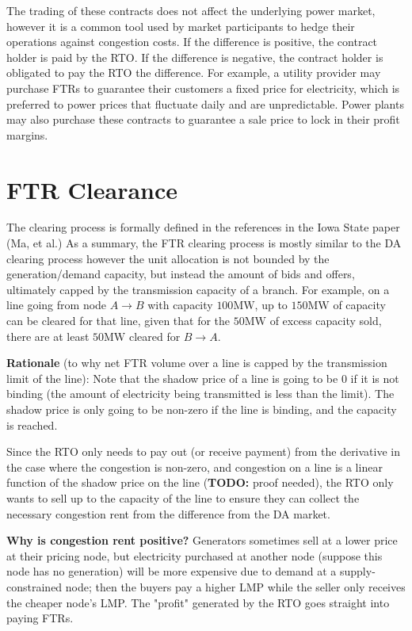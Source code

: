 \documentclass[11pt]{article}
\begin{document}
The trading of these contracts does not affect the underlying power market, however it is a common tool used by market participants to hedge their operations against congestion costs. If the difference is positive, the contract holder is paid by the RTO. If the difference is negative, the contract holder is obligated to pay the RTO the difference. For example, a utility provider may purchase FTRs to guarantee their customers a fixed price for electricity, which is preferred to power prices that fluctuate daily and are unpredictable. Power plants may also purchase these contracts to guarantee a sale price to lock in their profit margins.

\newpage

\section{FTR Clearance}
The clearing process is formally defined in the references in the Iowa State paper (Ma, et al.) As a summary, the FTR clearing process is mostly similar to the DA clearing process however the unit allocation is not bounded by the generation/demand capacity, but instead the amount of bids and offers, ultimately capped by the transmission capacity of a branch. For example, on a line going from node $A \rightarrow B$ with capacity $100\text{MW}$, up to $150\text{MW}$ of capacity can be cleared for that line, given that for the $50\text{MW}$ of excess capacity sold, there are at least $50\text{MW}$ cleared for $B \rightarrow A$.

\textbf{Rationale} (to why net FTR volume over a line is capped by the transmission limit of the line): Note that the shadow price of a line is going to be 0 if it is not binding (the amount of electricity being transmitted is less than the limit). The shadow price is only going to be non-zero if the line is binding, and the capacity is reached.

Since the RTO only needs to pay out (or receive payment) from the derivative in the case where the congestion is non-zero, and congestion on a line is a linear function of the shadow price on the line (\textbf{TODO:} proof needed), the RTO only wants to sell up to the capacity of the line to ensure they can collect the necessary congestion rent from the difference from the DA market.

\textbf{Why is congestion rent positive? } Generators sometimes sell at a lower price at their pricing node, but electricity purchased at another node (suppose this node has no generation) will be more expensive due to demand at a supply-constrained node; then the buyers pay a higher LMP while the seller only receives the cheaper node's LMP. The "profit" generated by the RTO goes straight into paying FTRs.
\end{document}
